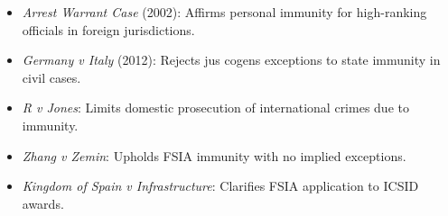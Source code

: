 \begin{itemize}
\begin{itemize}
        \item \textit{Arrest Warrant Case} (2002): Affirms personal immunity for high-ranking officials in foreign jurisdictions.
        \item \textit{Germany v Italy} (2012): Rejects jus cogens exceptions to state immunity in civil cases.
        \item \textit{R v Jones}: Limits domestic prosecution of international crimes due to immunity.
        \item \textit{Zhang v Zemin}: Upholds FSIA immunity with no implied exceptions.
        \item \textit{Kingdom of Spain v Infrastructure}: Clarifies FSIA application to ICSID awards.
    \end{itemize}
\end{itemize}

